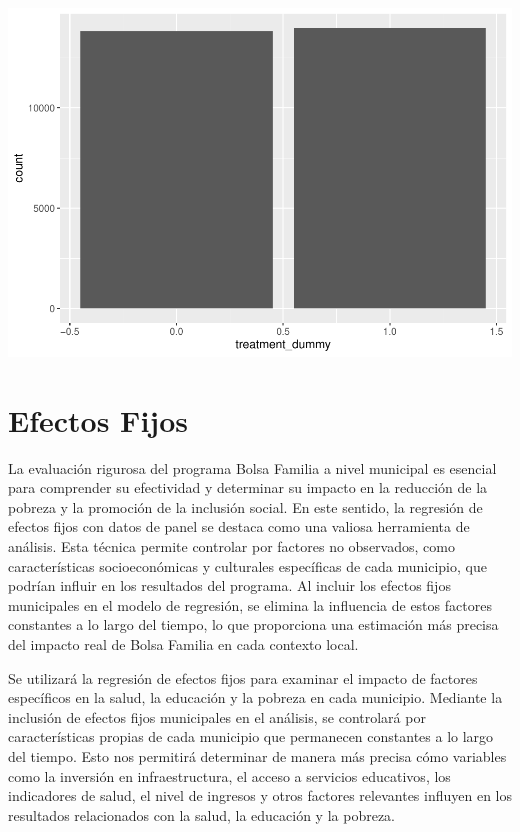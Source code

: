 \documentclass[
]{article}
\begin{document}
\includegraphics{PBF_files/figure-latex/unnamed-chunk-5-1.pdf}

\newpage

\hypertarget{efectos-fijos}{%
\section{Efectos Fijos}\label{efectos-fijos}}

La evaluación rigurosa del programa Bolsa Familia a nivel municipal es
esencial para comprender su efectividad y determinar su impacto en la
reducción de la pobreza y la promoción de la inclusión social. En este
sentido, la regresión de efectos fijos con datos de panel se destaca
como una valiosa herramienta de análisis. Esta técnica permite controlar
por factores no observados, como características socioeconómicas y
culturales específicas de cada municipio, que podrían influir en los
resultados del programa. Al incluir los efectos fijos municipales en el
modelo de regresión, se elimina la influencia de estos factores
constantes a lo largo del tiempo, lo que proporciona una estimación más
precisa del impacto real de Bolsa Familia en cada contexto local.

Se utilizará la regresión de efectos fijos para examinar el impacto de
factores específicos en la salud, la educación y la pobreza en cada
municipio. Mediante la inclusión de efectos fijos municipales en el
análisis, se controlará por características propias de cada municipio
que permanecen constantes a lo largo del tiempo. Esto nos permitirá
determinar de manera más precisa cómo variables como la inversión en
infraestructura, el acceso a servicios educativos, los indicadores de
salud, el nivel de ingresos y otros factores relevantes influyen en los
resultados relacionados con la salud, la educación y la pobreza.
\end{document}
